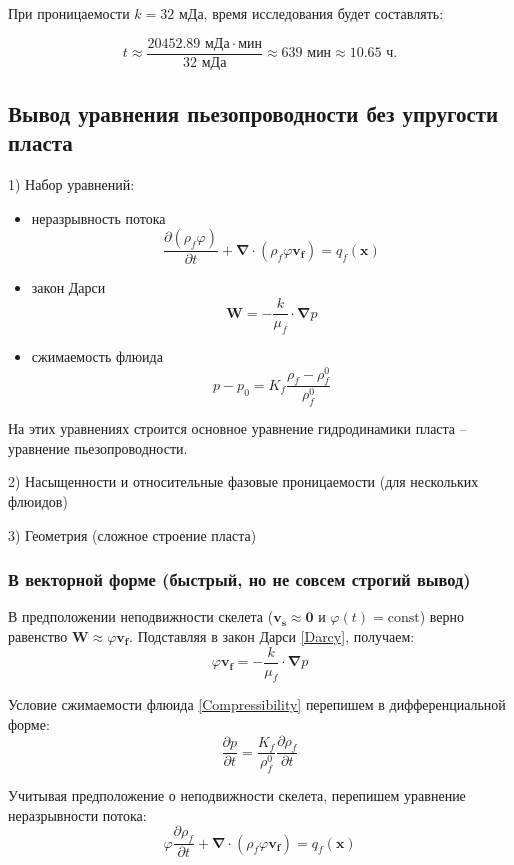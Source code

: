 \documentclass[a4paper,12pt]{article}
\newcommand{\beq}{\begin{equation}}
\newcommand{\eeq}{\end{equation}}
\begin{document}
При проницаемости $k=32\text{ мДа}$, время исследования будет составлять:

\beq
t\approx\frac{20452.89\text{ мДа}\cdot\text{мин}}{32\text{ мДа}}\approx 639 \text{ мин}\approx10.65\text{ ч}.
\eeq

\subsection{Вывод уравнения пьезопроводности без упругости пласта}

1) Набор уравнений:
\begin{itemize}
	\item неразрывность потока
	\beq\label{Continuity}
	\frac{\partial\left(\rho_f\varphi\right)}{\partial t}+\pmb{\nabla}\cdot\left(\rho_f\varphi \pmb{v_f}\right)=q_f(\pmb{x})
	\eeq
	\item закон Дарси
	\beq\label{Darcy}
	\pmb{W}=-\frac{k}{\mu_f}\cdot\pmb{\nabla} p
	\eeq
	\item сжимаемость флюида
	\beq\label{Compressibility}
	p-p_0=K_f\frac{\rho_f-\rho_f^0}{\rho_f^0}
	\eeq
\end{itemize}

На этих уравнениях строится основное уравнение гидродинамики пласта -- уравнение пьезопроводности.

2) Насыщенности и относительные фазовые проницаемости (для нескольких флюидов)

3) Геометрия (сложное строение пласта)

\subsubsection{В векторной форме (быстрый, но не совсем строгий вывод)}

В предположении неподвижности скелета ($\pmb{v_s}\approx \pmb{0}$ и $\varphi(t)=\textrm{const}$) верно равенство $\pmb{W}\approx\varphi \pmb{v_f}$. Подставляя в закон Дарси \eqref{Darcy}, получаем:
\beq\label{DarcyWithSkeletNotMoving}
\varphi \pmb{v_f}=-\frac{k}{\mu_f}\cdot\pmb{\nabla} p
\eeq

Условие сжимаемости флюида \eqref{Compressibility} перепишем в дифференциальной форме:
\beq\label{CompressibilityDiff}
\frac{\partial p}{\partial t}=\frac{K_f}{\rho_f^0}\frac{\partial\rho_f}{\partial t}
\eeq

Учитывая предположение о неподвижности скелета, перепишем уравнение неразрывности потока:
\beq\label{ContinuityWithSkeletNotMoving}
\varphi\frac{\partial\rho_f}{\partial t}+\pmb{\nabla}\cdot\left(\rho_f\varphi\pmb{v_f}\right)=q_f(\pmb{x})
\eeq
\end{document}
